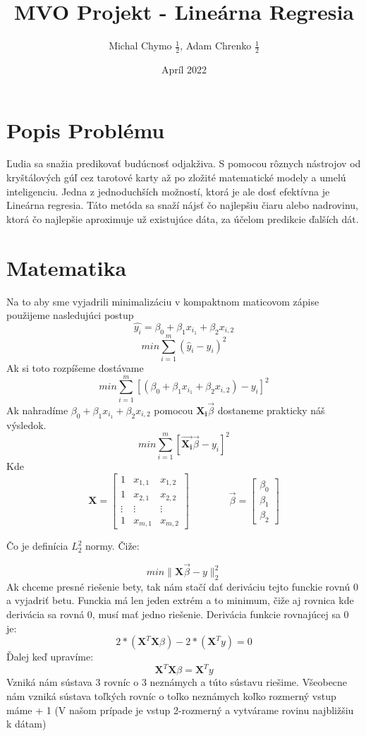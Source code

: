 \documentclass{article}
\title{MVO Projekt - Lineárna Regresia}
\author{Michal Chymo $\frac{1}{2}$, Adam Chrenko $\frac{1}{2}$}
\date{Apríl 2022}
\begin{document}
\maketitle
\section{Popis Problému}
Ľudia sa snažia predikovať budúcnosť odjakživa. S pomocou rôznych nástrojov od kryštálových gúľ cez tarotové karty až po zložité matematické modely a umelú inteligenciu. Jedna z jednoduchších možností, ktorá je ale dosť efektívna je Lineárna regresia. Táto metóda sa snaží nájsť čo najlepšiu čiaru alebo nadrovinu, ktorá čo najlepšie aproximuje už existujúce dáta, za účelom predikcie ďalších dát. 

\section{Matematika}
Na to aby sme vyjadrili minimalizáciu v kompaktnom maticovom zápise použijeme nasledujúci postup
\[\hat{y_i} = \beta_{0} + \beta_{1}x_{i_1} + \beta_{2}x_{i,2} \]
\[min \sum_{i=1}^{m} (\hat{y}_i - y_i)^2\]
Ak si toto rozpíšeme dostávame
\[
min \sum_{i=1}^{m} \left[(\beta_{0} + \beta_{1}x_{i_1} + \beta_{2}x_{i,2}) - y_i\right]^2
\]
Ak nahradíme $\beta_{0} + \beta_{1}x_{i_1} + \beta_{2}x_{i,2}$ pomocou $\mathbf{X_i}\vec{\beta}$ dostaneme prakticky náš výsledok.
\[
min \sum_{i=1}^{m} \left[\vec{\mathbf{X_i}}\vec{\beta} - y_i\right]^2
\]Kde 
\[\mathbf{X} = 
\begin{bmatrix} 
1 & x_{1,1} & x_{1,2} \\ 
1 & x_{2,1} & x_{2,2} \\
\vdots & \vdots & \vdots \\
1 & x_{m,1} & x_{m,2} 
\end{bmatrix}
\qquad\qquad
\Vec{\beta}=
\begin{bmatrix}
\beta_0\\ \beta_1 \\ \beta_2
\end{bmatrix}
\] 

Čo je definícia $L_2^2$ normy. Čiže:

\[
min \|\mathbf{X}\vec{\beta} - y\|_2^2
\]
Ak chceme presné riešenie bety, tak nám stačí dať deriváciu tejto funckie rovnú 0 a vyjadriť betu. Funckia má len jeden extrém a to minimum, čiže aj rovnica kde derivácia sa rovná 0, musí mať jedno riešenie. Derivácia funkcie rovnajúcej sa 0 je:
\[ 2*(\mathbf{X}^T\mathbf{X}\beta) - 2 * (\mathbf{X}^Ty) = 0 \]
Ďalej keď upravíme:
\[ \mathbf{X}^T\mathbf{X}\beta = \mathbf{X}^Ty \]
Vzniká nám sústava 3 rovníc o 3 neznámych a túto sústavu riešime. Všeobecne nám vzniká sústava toľkých rovníc o toľko neznámych koľko rozmerný vstup máme + 1 (V našom prípade je vstup 2-rozmerný a vytvárame rovinu najbližšiu k dátam)
\end{document}
